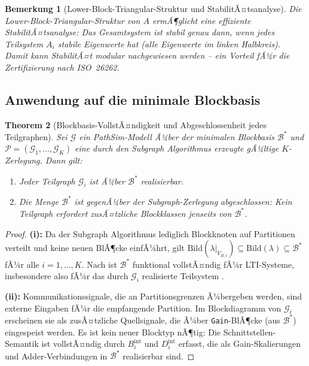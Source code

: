 ﻿\documentclass[12pt,a4paper]{article}
\newtheorem{theorem}{Theorem}[section]
\newtheorem{bemerkung}[theorem]{Bemerkung}
\theoremstyle{definition}
\begin{document}
\begin{bemerkung}[Lower-Block-Triangular-Struktur und StabilitÃ¤tsanalyse]
\label{bem:lbt}
Die Lower-Block-Triangular-Struktur von $A$ ermÃ¶glicht eine effiziente
StabilitÃ¤tsanalyse: Das Gesamtsystem ist stabil genau dann, wenn jedes
Teilsystem $A_i$ stabile Eigenwerte hat (alle Eigenwerte im linken Halbkreis).
Damit kann StabilitÃ¤t \emph{modular} nachgewiesen werden -- ein Vorteil
fÃ¼r die Zertifizierung nach ISO~26262.
\end{bemerkung}

\subsection{Anwendung auf die minimale Blockbasis}
\label{subsec:subgraph-basis}

\begin{theorem}[Blockbasis-VollstÃ¤ndigkeit und Abgeschlossenheit jedes Teilgraphen]
\label{thm:subgraph-basis}
Sei $\mathcal{G}$ ein PathSim-Modell Ã¼ber der minimalen Blockbasis
$\mathcal{B}^*$ und $\mathcal{P} = (\mathcal{G}_1, \ldots, \mathcal{G}_K)$
eine durch den Subgraph Algorithmus erzeugte gÃ¼ltige $K$-Zerlegung.
Dann gilt:
\begin{enumerate}[label=(\roman*), nosep]
  \item Jeder Teilgraph $\mathcal{G}_i$ ist Ã¼ber $\mathcal{B}^*$ realisierbar.
  \item Die Menge $\mathcal{B}^*$ ist gegenÃ¼ber der Subgraph-Zerlegung
        abgeschlossen: Kein Teilgraph erfordert zusÃ¤tzliche Blockklassen
        jenseits von $\mathcal{B}^*$.
\end{enumerate}
\end{theorem}

\begin{proof}
\textbf{(i):}
Da der Subgraph Algorithmus lediglich Blockknoten auf Partitionen verteilt
und keine neuen BlÃ¶cke einfÃ¼hrt, gilt
$\mathrm{Bild}(\lambda|_{V_{B,i}}) \subseteq \mathrm{Bild}(\lambda)
\subseteq \mathcal{B}^*$ fÃ¼r alle $i = 1, \ldots, K$.
Nach  ist $\mathcal{B}^*$ funktional vollstÃ¤ndig
fÃ¼r LTI-Systeme, insbesondere also fÃ¼r das durch $\mathcal{G}_i$
realisierte Teilsystem .

\textbf{(ii):}
Kommunikationssignale, die an Partitionsgrenzen Ã¼bergeben werden,
sind externe Eingaben fÃ¼r die empfangende Partition. Im Blockdiagramm
von $\mathcal{G}_i$ erscheinen sie als zusÃ¤tzliche Quellsignale, die
Ã¼ber \texttt{Gain}-BlÃ¶cke (aus $\mathcal{B}^*$) eingespeist werden.
Es ist kein neuer Blocktyp nÃ¶tig: Die Schnittstellen-Semantik ist
vollstÃ¤ndig durch $B_i^{\mathrm{int}}$ und $D_i^{\mathrm{int}}$ erfasst,
die als Gain-Skalierungen und Adder-Verbindungen in $\mathcal{B}^*$
realisierbar sind.
\end{proof}
\end{document}
